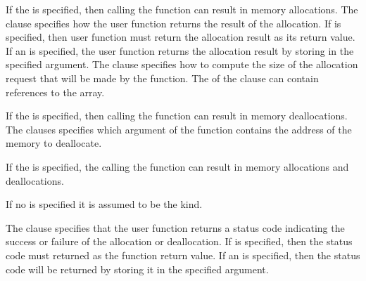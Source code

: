 \begin{ccppspecific}
If the   is specified, then calling the  function can result in memory allocations. The  clause specifies how the user function returns the result of the allocation. If  is specified, then user function must return the allocation result as its return value. If an  is specified, the user function returns the allocation result by storing in the specified argument. The  clause specifies how to compute the size of the allocation request that will be made by the function. The  of the  clause can contain references to the  array.

If the   is specified, then calling the  function can result in memory deallocations. The  clauses specifies which argument of the function contains the address of the memory to deallocate.

If the   is specified, the calling the  function can result in memory allocations and deallocations.

If no  is specified it is assumed to be the  kind.

The  clause specifies that the user function returns a status code indicating the success or failure of the allocation or deallocation. If  is specified, then the status code must returned as the function return value. If an  is specified, then the status code will be returned by storing it in the specified argument.


\end{ccppspecific}
